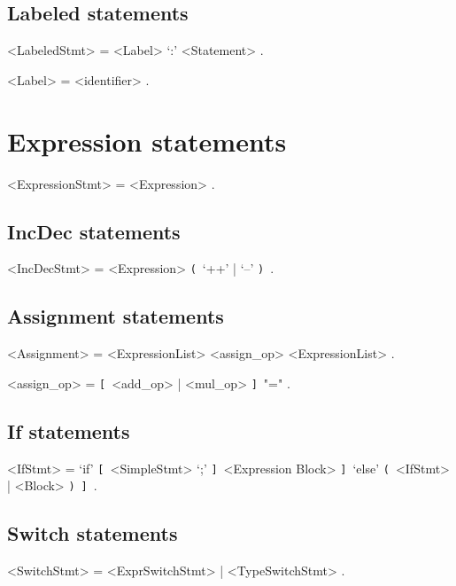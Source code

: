 \documentclass{article}
\def\lopt{\synshortsoff\texttt{[}\synshorts~}
\def\ropt{\synshortsoff\texttt{]}\synshorts~}
\def\lgrp{\synshortsoff\texttt{(}\synshorts~}
\def\rgrp{\synshortsoff\texttt{)}\synshorts~}
\begin{document}
\subsection*{Labeled statements}
\begin{grammar}
	<LabeledStmt> = <Label> `:' <Statement> .

	<Label> = <identifier> .
\end{grammar}

\section*{Expression statements}
\begin{grammar}
	<ExpressionStmt> = <Expression> .
\end{grammar}

\subsection*{IncDec statements}
\begin{grammar}
	<IncDecStmt> = <Expression> \lgrp `++' | `--' \rgrp .
\end{grammar}

\subsection*{Assignment statements}
\begin{grammar}
	<Assignment> = <ExpressionList> <assign_op> <ExpressionList> .

	<assign_op> = \lopt <add_op> | <mul_op> \ropt "=" .
\end{grammar}

\subsection*{If statements}
\begin{grammar}
	<IfStmt> = `if' \lopt <SimpleStmt> `;' \ropt <Expression Block> \ropt `else' \lgrp <IfStmt> | <Block> \rgrp \ropt .
\end{grammar}



\subsection*{Switch statements}
\begin{grammar}
	<SwitchStmt> = <ExprSwitchStmt> | <TypeSwitchStmt> .
\end{grammar}
\end{document}
